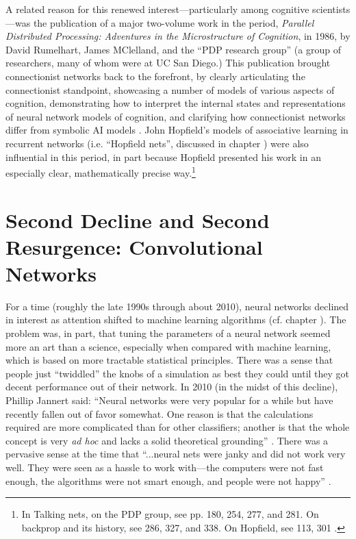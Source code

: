 A related reason for this renewed interest---particularly among cognitive scientists---was the publication of a major two-volume work in the period, {\em Parallel Distributed Processing: Adventures in the Microstructure of Cognition}, in 1986, by David Rumelhart, James MClelland, and the ``PDP research group'' (a group of researchers, many of whom were at UC San Diego.)  This publication brought connectionist networks back to the forefront, by clearly articulating the connectionist standpoint, showcasing a number of models of various aspects of cognition, demonstrating how to interpret the internal states and representations of neural network models of cognition, and clarifying how connectionist networks differ from symbolic AI models \cite{rumelhart1986parallel}. John Hopfield's models of associative learning in recurrent networks (i.e. ``Hopfield nets'', discussed in chapter ) were also influential in this period, in part because Hopfield presented his work in an especially clear, mathematically precise way.\cite{hopfield1982neural}\footnote{In Talking nets, on the PDP group, see pp. 180, 254, 277, and 281. On  backprop and its history, see 286, 327, and 338. On Hopfield, see 113, 301 \cite{anderson2000talking}.}


\section{Second Decline and Second Resurgence: Convolutional Networks}\label{deep_revolution}

For a time (roughly the late 1990s through about 2010), neural networks declined in interest as attention shifted to machine learning algorithms (cf. chapter ). The problem was, in part, that tuning the parameters of a neural network seemed more an art than a science, especially when compared with machine learning, which is based on more tractable statistical principles. There was a sense that people just ``twiddled''  the knobs of a simulation as best they could until they got decent performance out of their network. In 2010 (in the midst of this decline), Phillip Jannert said: ``Neural networks were very popular for a while but have recently fallen out of favor somewhat. One reason is that the calculations required are more complicated than for other classifiers; another is that the whole concept is very \emph{ad hoc} and lacks a solid theoretical grounding'' \cite[Ch. 18]{janert2010data}.  There was a pervasive sense at the time that ``...neural nets were janky and did not work very well. They were seen as a hassle to work with---the computers were not fast enough, the algorithms were not smart enough, and people were not happy'' \cite{kurenkov2020briefhistory}.

